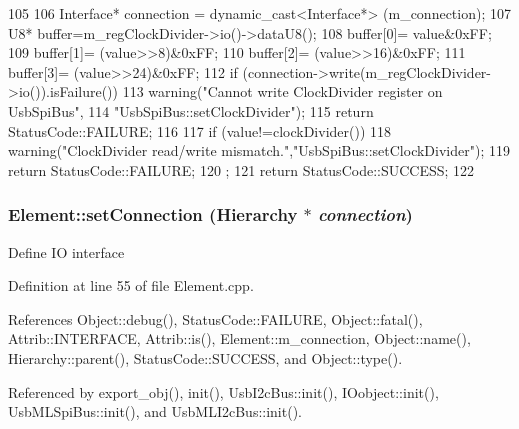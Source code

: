 \begin{DoxyCode}
105                                               {
106   Interface* connection = dynamic_cast<Interface*> (m_connection);
107   U8* buffer=m_regClockDivider->io()->dataU8();
108   buffer[0]= value&0xFF;
109   buffer[1]= (value>>8)&0xFF;
110   buffer[2]= (value>>16)&0xFF;
111   buffer[3]= (value>>24)&0xFF;
112   if (connection->write(m_regClockDivider->io()).isFailure()){
113     warning("Cannot write ClockDivider register on UsbSpiBus",
114         "UsbSpiBus::setClockDivider");
115     return StatusCode::FAILURE;
116   } 
117   if (value!=clockDivider()){
118     warning("ClockDivider read/write mismatch.","UsbSpiBus::setClockDivider");
119     return StatusCode::FAILURE;
120   };
121   return StatusCode::SUCCESS;
122 }
\end{DoxyCode}
\hypertarget{classElement_ab476b4b1df5954141ceb14f072433b89}{
\subsubsection[{setConnection}]{ Element::setConnection ({\bf Hierarchy} $\ast$ {\em connection})}}
\label{classElement_ab476b4b1df5954141ceb14f072433b89}
Define IO interface 

Definition at line 55 of file Element.cpp.

References Object::debug(), StatusCode::FAILURE, Object::fatal(), Attrib::INTERFACE, Attrib::is(), Element::m\_\-connection, Object::name(), Hierarchy::parent(), StatusCode::SUCCESS, and Object::type().

Referenced by export\_\-obj(), init(), UsbI2cBus::init(), IOobject::init(), UsbMLSpiBus::init(), and UsbMLI2cBus::init().


